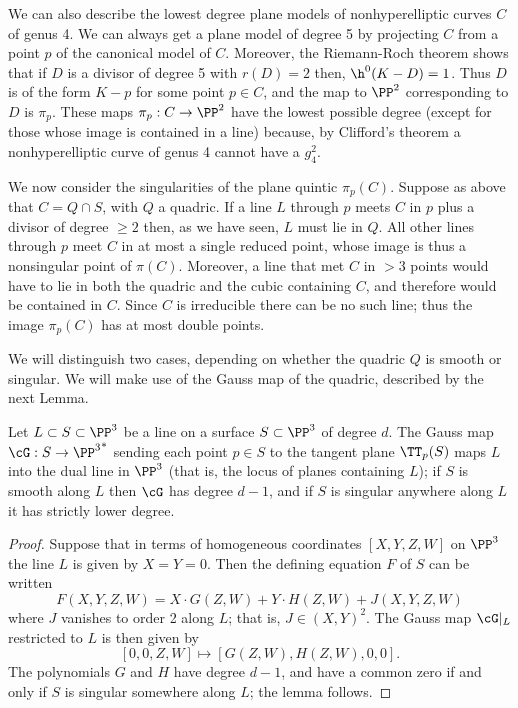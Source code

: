 We can also describe the lowest degree plane models of nonhyperelliptic curves $C$ of genus 4. 
We can always get a plane model of degree 5 by projecting $C$ from a point $p$ of the canonical model of $C$. Moreover, the Riemann-Roch theorem shows that if $D$ is a divisor of degree 5 with $r(D)=2$ then,  $\h^0(K-D) = 1$. Thus $D$ is of the form $K-p$ for some point $p \in C$, and the map to $\PP^2$ corresponding to $D$ is $\pi_p$. These  maps $\pi_p: C\to \PP^2$ have the lowest possible degree (except for those whose image is  contained in a line) because, by Clifford's theorem a nonhyperelliptic curve of genus 4 cannot have a $g^2_4$.

We now consider the singularities of the plane quintic $\pi_p(C)$. Suppose as above that $C = Q\cap S$, with $Q$ a quadric. If a line $L$ through $p$ meets $C$ in $p$ plus a divisor of degree $\geq 2$ then, as we have seen, $L$ must lie in $Q$.  All other lines through $p$ meet $C$ in at most a single reduced point,  whose image is thus a nonsingular point of $\pi(C)$. Moreover, a line that met $C$ in $>3$ points would have to lie in both the quadric and the cubic containing $C$, and therefore would be contained in $C$. Since $C$ is irreducible there can be no such line; thus the image $\pi_p(C)$ has at most double points.

We will distinguish two cases, depending on whether the quadric $Q$ is smooth or singular. We will make use of the Gauss map of the quadric, described by the next Lemma.

\begin{lemma}
Let $L \subset S \subset \PP^3$ be a line on a surface $S \subset \PP^3$ of degree $d$. The Gauss map $\cG : S \to {\PP^3}^*$ sending each point $p \in S$ to the tangent plane $\TT_p(S)$ maps $L$ into the dual line in $\PP^3$ (that is, the locus of planes containing $L$); if $S$ is smooth along $L$ then $\cG$  has degree $d-1$, and if $S$ is singular anywhere along $L$ it has strictly lower degree.
\end{lemma}

\begin{proof}
Suppose that in terms of homogeneous coordinates $[X,Y,Z,W]$ on $\PP^3$ the line $L$ is given by $X = Y = 0$. Then the defining equation $F$ of $S$ can be written
$$
F(X,Y,Z,W) = X\cdot G(Z,W) + Y\cdot H(Z,W) + J(X,Y,Z,W)
$$
where $J$ vanishes to order 2 along $L$; that is, $J \in (X,Y)^2$. The Gauss map $\cG|_L$ restricted to $L$ is then given by
$$
[0,0,Z,W] \mapsto [G(Z,W), H(Z,W), 0, 0].
$$
The polynomials $G$ and $H$ have degree $d-1$, and have a common zero if and only if $S$ is singular somewhere along $L$; the lemma follows.
\end{proof}

